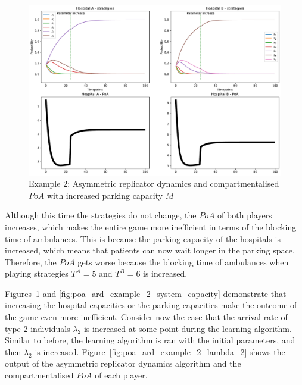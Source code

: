 \begin{figure}[H]
    \centering
    \includegraphics[width=\linewidth]{chapters/05_numerical_results/Bin/example_2/poa_ard_example_2_parking_space.pdf}
    \caption{Example 2: Asymmetric replicator dynamics and compartmentalised
    \(PoA\) with increased parking capacity \(M\)}
    \label{fig:poa_ard_example_2_parking_capacity}
\end{figure}

Although this time the strategies do not change, the \(PoA\) of both players
increases, which makes the entire game more inefficient in terms of the
blocking time of ambulances.
This is because the parking capacity of the hospitals is increased, which means
that patients can now wait longer in the parking space.
Therefore, the \(PoA\) gets worse because the blocking time of ambulances
when playing strategies \(T^A = 5\) and \(T^B = 6\) is increased.

Figures~\ref{fig:poa_ard_example_2_parking_capacity} and
\ref{fig:poa_ard_example_2_system_capacity} demonstrate that increasing
the hospital capacities or the parking capacities make the outcome of the game
even more inefficient.
Consider now the case that the arrival rate of type 2 individuals \(\lambda_2\)
is increased at some point during the learning algorithm.
Similar to before, the learning algorithm is ran with the initial parameters,
and then \(\lambda_2\) is increased.
Figure~\ref{fig:poa_ard_example_2_lambda_2} shows the output of the asymmetric
replicator dynamics algorithm and the compartmentalised \(PoA\) of each player.


